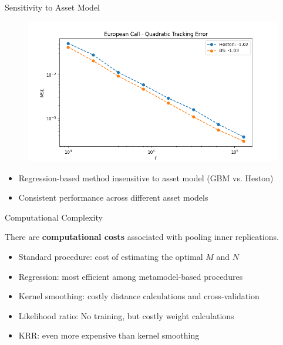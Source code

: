 \documentclass[9pt,handout]{beamer}
\begin{document}
\begin{frame}{Sensitivity to Asset Model}

\begin{figure}
    \includegraphics[width=\textwidth]{../project1/figures/figure10a.png}
\end{figure}

\begin{itemize}
    \item Regression-based method insensitive to asset model (GBM vs. Heston)
    \item Consistent performance across different asset models
\end{itemize}

\end{frame}

\begin{frame}{Computational Complexity}

    There are \textbf{computational costs} associated with pooling inner replications.

    \begin{itemize}
        \item Standard procedure: cost of estimating the optimal $M$ and $N$
        \item Regression: most efficient among metamodel-based procedures
        \item Kernel smoothing: costly distance calculations and cross-validation
        \item Likelihood ratio: No training, but costly weight calculations
        \item KRR: even more expensive than kernel smoothing
    \end{itemize}

\end{frame}
\end{document}

